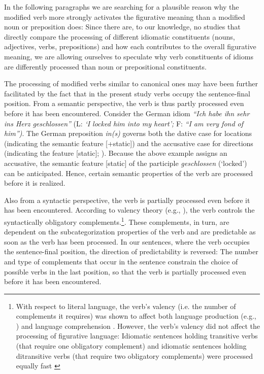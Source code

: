 In the following paragraphs we are searching for a plausible reason why the modified verb more strongly activates the figurative meaning than a modified noun or preposition does: Since there are, to our knowledge, no studies that directly compare the processing of different idiomatic constituents (nouns, adjectives, verbs, prepositions) and how each contributes to the overall figurative meaning, we are allowing ourselves to speculate why verb constituents of idioms are differently processed than noun or prepositional constituents. 

The processing of modified verbs similar to canonical ones may have been further facilitated by the fact that in the present study verbs occupy the sentence-final position.  From a semantic perspective, the verb is thus partly processed even before it has been encountered.  Consider the German idiom \textit{``Ich habe ihn sehr ins Herz geschlossen''} (L: \textit{`I locked him into my heart';} F: \textit{``I am very fond of him'')}. The German preposition \textit{in(s)} governs both the dative case for locations (indicating the semantic feature [+static]) and the accusative case for directions (indicating the feature [\textendash static]; \citealt{gansel:1992}). Because the above example assigns an accusative, the semantic feature [\textendash static] of the participle \textit{geschlossen} (‘locked’) can be anticipated. Hence, certain semantic properties of the verb are processed before it is realized.

Also from a syntactic perspective, the verb is partially processed even before it has been encountered. According to valency theory (e.g., \citealt{tesniere:1959}), the verb controls the syntactically obligatory complements.\footnote{With respect to literal language, the verb’s valency (i.e. the number of complements it requires) was shown to affect both language production (e.g., \citealt{thompson:1997}) and language comprehension \citep{shapiro:1987}. However, the verb’s valency did not affect the processing of figurative language: Idiomatic sentences holding transitive verbs (that require one obligatory complement) and idiomatic sentences holding ditransitive verbs (that require two obligatory complements) were processed equally fast \citep{dorrestars}}. These complements, in turn, are dependent on the subcategorization properties of the verb and are predictable as soon as the verb has been processed. In our sentences, where the verb occupies the sentence-final position, the direction of predictability is reversed: The number and type of complements that occur in the sentence constrain the choice of possible verbs in the last position, so that the verb is partially processed even before it has been encountered.


